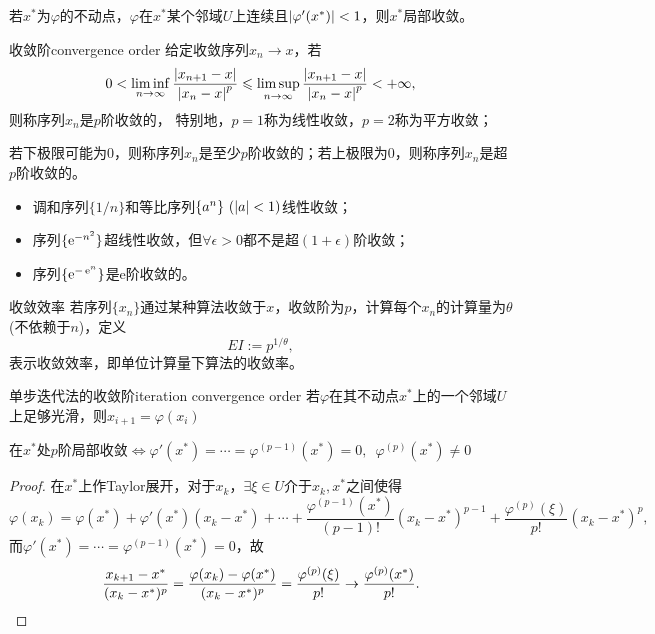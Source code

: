 \begin{corollary}
    若$x^*$为$\varphi$的不动点，$\varphi$在$x^*$某个邻域$U$上连续且$\left\lvert\varphi'(x^*)\right\rvert<1$，则$x^*$局部收敛。
\end{corollary}

\begin{definition}
    {收敛阶}{convergence order}
    给定收敛序列$x_n\to x$，若
    \begin{equation}
        0<\liminf_{n\to\infty}\frac{\left\lvert x_{n+1}-x\right\rvert}{\left\lvert x_n-x\right\rvert^p}\leqslant\limsup_{n\to\infty}\frac{\left\lvert x_{n+1}-x\right\rvert}{\left\lvert x_n-x\right\rvert^p}<+\infty,
    \end{equation}
    则称序列$x_n$是$p$阶收敛的，
    特别地，$p=1$称为线性收敛，$p=2$称为平方收敛；

    若下极限可能为0，则称序列$x_n$是至少$p$阶收敛的；若上极限为0，则称序列$x_n$是超$p$阶收敛的。
\end{definition}

\begin{example}
    {}{}
    \begin{itemize}
        \item 调和序列$\{1/n\}$和等比序列$\{a^n\}~(\left\lvert a\right\rvert<1)$线性收敛；
        \item 序列$\{\mathop{}\!\mathrm{e}^{-n^2}\}$超线性收敛，但$\forall\epsilon>0$都不是超$(1+\epsilon)$阶收敛；
        \item 序列$\{\mathop{}\!\mathrm{e}^{-\mathop{}\!\mathrm{e}^ n}\}$是e阶收敛的。
    \end{itemize}
\end{example}

\begin{definition}
    {收敛效率}{}
    若序列$\{x_n\}$通过某种算法收敛于$x$，收敛阶为$p$，计算每个$x_n$的计算量为$\theta$ (不依赖于$n$)，定义
    \[
        EI:=p^{1/\theta},
    \]
    表示收敛效率，即单位计算量下算法的收敛率。
\end{definition}

\begin{theorem}
    {单步迭代法的收敛阶}{iteration convergence order}
    若$\varphi$在其不动点$x^*$上的一个邻域$U$上足够光滑，则$x_{i+1}=\varphi(x_i)$
    \begin{center}
        在$x^*$处$p$阶局部收敛$\iff\varphi'(x^*)=\cdots=\varphi^{(p-1)}(x^*)=0,\enspace\varphi^{(p)}(x^*)\neq 0$
    \end{center}
\end{theorem}

\begin{proof}
    在$x^*$上作Taylor展开，对于$x_k$，$\exists\xi\in U$介于$x_k,x^*$之间使得
    \[
        \varphi(x_k)=\varphi(x^*)+\varphi'(x^*)(x_k-x^*)+\cdots+\frac{\varphi^{(p-1)}(x^*)}{(p-1)!}(x_k-x^*)^{p-1}+\frac{\varphi^{(p)}(\xi)}{p!}(x_k-x^*)^p,
    \]
    而$\varphi'(x^*)=\cdots=\varphi^{(p-1)}(x^*)=0$，故
    \[
        \frac{x_{k+1}-x^*}{(x_k-x^*)^p}=\frac{\varphi(x_k)-\varphi(x^*)}{(x_k-x^*)^p}
        =\frac{\varphi^{(p)}(\xi)}{p!}\to\frac{\varphi^{(p)}(x^*)}{p!}.
        \qedhere
    \]
\end{proof}


